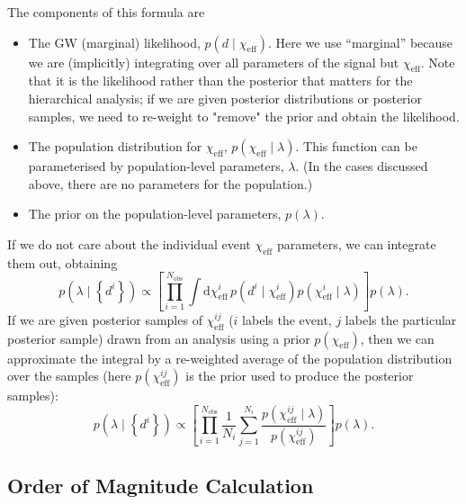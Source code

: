 \documentclass[modern,linenumbers]{aastex61}
\newcommand{\chieff}{\chi_\mathrm{eff}}
\newcommand{\dd}{\mathrm{d}}
\begin{document}
The components of this formula are
\begin{itemize}
\item The GW (marginal) likelihood, $p\left(d \mid \chieff\right)$.
  Here we use ``marginal'' because we are (implicitly) integrating
  over all parameters of the signal but $\chieff$.  Note that it is
  the likelihood rather than the posterior that matters for the
  hierarchical analysis; if we are given posterior distributions or
  posterior samples, we need to re-weight to "remove" the prior and
  obtain the likelihood.
\item The population distribution for $\chieff$,
  $p\left( \chieff \mid \lambda \right)$.  This function can be
  parameterised by population-level parameters, $\lambda$.  (In the
  cases discussed above, there are no parameters for the population.)
\item The prior on the population-level parameters, $p(\lambda)$.
\end{itemize}
If we do not care about the individual event $\chieff$ parameters, we
can integrate them out, obtaining
\begin{equation}
  p\left( \lambda \mid \left\{ d^i \right\} \right) \propto \left[ \prod_{i=1}^{N_\mathrm{obs}} \int \dd \chieff^i \, p\left(d^i \mid \chieff^i \right) p\left( \chieff^i \mid \lambda \right) \right] p\left(\lambda\right).
\end{equation}
If we are given posterior samples of $\chieff^{ij}$ ($i$ labels the
event, $j$ labels the particular posterior sample) drawn from an
analysis using a prior $p\left( \chieff \right)$, then we can
approximate the integral by a re-weighted average of the population
distribution over the samples (here $p\left( \chieff^{ij} \right)$ is
the prior used to produce the posterior samples):
\begin{equation}
  p\left( \lambda \mid \left\{ d^i \right\} \right) \propto \left[ \prod_{i=1}^{N_\mathrm{obs}} \frac{1}{N_i} \sum_{j=1}^{N_i} \frac{p\left( \chieff^{ij} \mid \lambda \right)}{p\left( \chieff^{ij} \right)} \right] p\left(\lambda\right).
  \label{eq:hierarchical-posterior}
\end{equation}

\subsection{Order of Magnitude Calculation}
\label{sec:om-odds-ratio}
\end{document}
